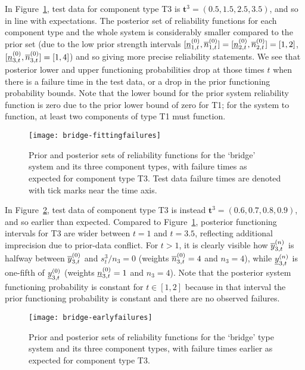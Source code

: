 \documentclass[12pt, a4paper]{elsarticle}
\newcommand{\bs}[1]{\boldsymbol{#1}}
\renewcommand{\vec}[1]{{\bs#1}}
\begin{document}
In Figure~\ref{fig:bridge-fitting}, 
test data for component type T3 is $\vec{t}^3 = (0.5, 1.5, 2.5, 3.5)$,
and so in line with expectations.
The posterior set of reliability functions for each component type and the whole system
is considerably smaller compared to the prior set
(due to the low prior strength intervals
$[\underline{n}^{(0)}_{1,t},\overline{n}^{(0)}_{1,t}] = [\underline{n}^{(0)}_{2,t},\overline{n}^{(0)}_{2,t}] = [1,2]$, $[\underline{n}^{(0)}_{3,t},\overline{n}^{(0)}_{3,t}] = [1,4]$)
and so giving more precise reliability statements.
We see that posterior lower and upper functioning probabilities drop at those times $t$
when there is a failure time in the test data,
or a drop in the prior functioning probability bounds.
Note that the lower bound for the prior system reliability function is zero
due to the prior lower bound of zero for T1;
for the system to function, at least two components of type T1 must function.

\begin{figure}
\texttt{[image: bridge-fittingfailures]}
\caption{Prior and posterior sets of reliability functions for the `bridge' system and its three component types,
with failure times as expected for component type T3.
Test data failure times are denoted with tick marks near the time axis.}
\label{fig:bridge-fitting}
\end{figure}

In Figure~\ref{fig:bridge-early},
test data of component type T3 is instead $\vec{t}^3 = (0.6, 0.7, 0.8, 0.9)$,
and so earlier than expected.
Compared to Figure~\ref{fig:bridge-fitting},
posterior functioning intervals for T3 are wider between $t=1$ and $t=3.5$,
reflecting additional imprecision due to prior-data conflict.
For $t > 1$, it is clearly visible how $\overline{y}^{(n)}_{3,t}$ is halfway between $\overline{y}^{(0)}_{3,t}$ and $s_t^3/n_3 = 0$
(weights $\overline{n}^{(0)}_{3,t} = 4$ and $n_3 = 4$),
while $\underline{y}^{(n)}_{3,t}$ is one-fifth of $\underline{y}^{(0)}_{3,t}$
(weights $\underline{n}^{(0)}_{3,t} = 1$ and $n_3 = 4$).
Note that the posterior system functioning probability is constant for $t \in [1,2]$
because in that interval the prior functioning probability is constant
and there are no observed failures.

\begin{figure}
\texttt{[image: bridge-earlyfailures]}
\caption{Prior and posterior sets of reliability functions for the `bridge' type system and its three component types,
with failure times earlier as expected for component type T3.}
\label{fig:bridge-early}
\end{figure}
\end{document}
